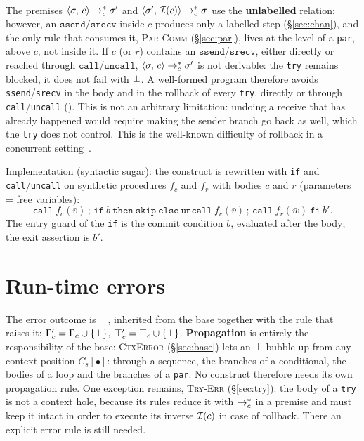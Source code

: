 \paragraph{} The premises
$\cfg{c}{\sigma} \toc^{*} \sigma'$ and $\cfg{\Inv{c}}{\sigma'} \toc^{*} \sigma$
use the \textbf{unlabelled} relation: however, an $\mathtt{ssend}$/$\mathtt{srecv}$
inside $c$ produces only a labelled step (\S\ref{sec:chan}), and the
only rule that consumes it, \textsc{Par-Comm} (\S\ref{sec:par}), lives at the
level of a \texttt{par}, above $c$, not inside it. If $c$ (or $r$) contains
an $\mathtt{ssend}$/$\mathtt{srecv}$, either directly or reached through
$\mathtt{call}$/$\mathtt{uncall}$, $\cfg{c}{\sigma} \toc^{*} \sigma'$ is not
derivable: the \texttt{try} remains blocked, it does not fail with $\err$. A
well-formed program therefore avoids \texttt{ssend}/\texttt{srecv} in the body and
in the rollback of every \texttt{try}, directly or through
\texttt{call}/\texttt{uncall} (). This is not an arbitrary
limitation: undoing a receive that has already happened would require making
the sender branch go back as well, which the \texttt{try} does not control. This is
the well-known difficulty of rollback in a concurrent
setting~\cite{LaneseMezzinaSchmittStefani2011,%
LaneseLienhardtMezzinaSchmittStefani2013}.

\noindent
Implementation (syntactic sugar): the construct is rewritten with \texttt{if}
and \texttt{call}/\texttt{uncall} on synthetic procedures $f_c$ and $f_r$ with bodies
$c$ and $r$ (parameters = free variables):
\[
\mathtt{call}\ f_c(\bar v)\,;\,
\mathtt{if}\ b\ \mathtt{then}\ \mathtt{skip}\ \mathtt{else}\
   \mathtt{uncall}\ f_c(\bar v)\,;\, \mathtt{call}\ f_r(\bar w)\ \mathtt{fi}\ b' .
\]
The entry guard of the \texttt{if} is the commit condition $b$, evaluated
after the body; the exit assertion is $b'$.

\section{Run-time errors}
\label{sec:err}

The error outcome is $\err$, inherited from the base together with the rule that
raises it: $\Gamma_c' = \Gamma_c \cup \{\err\}$, $\top_c' = \top_c \cup
\{\err\}$. \textbf{Propagation} is entirely the responsibility of the base:
\textcolor{red!60!black}{\textsc{CtxError}} (\S\ref{sec:base}) lets an
$\err$ bubble up from any context position $C_s[\bullet]$: through a
sequence, the branches of a conditional, the bodies of a loop and the branches of a
\texttt{par}. No construct therefore needs its own propagation
rule. One exception remains, \textcolor{red!60!black}{\textsc{Try-Err}}
(\S\ref{sec:try}): the body of a \texttt{try} is not a context hole,
because its rules reduce it with $\toc^{*}$ in a premise and must
keep it intact in order to execute its inverse $\Inv{c}$ in case of
rollback. There an explicit error rule is still needed.

